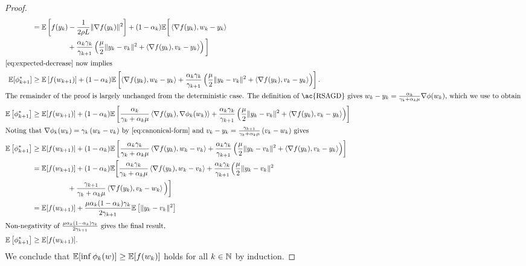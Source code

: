 \begin{proof}
\begin{align*}
        &=  \E\sbr{f(\yk) - \frac{1}{2\sgc L} \norm{\grad(\yk)}^2} + (1-\alpha_k) \E\bigg[\abr{\grad(\yk), \wk - \yk} \\ & \hspace{5em} + \frac{\alpha_k\gamma_k}{\gamma_{k+1}}\rbr{\frac{\mu}{2} \norm{\yk - v_k}^2 + \abr{\grad(\yk), v_k - \yk}}\bigg] \\
        \intertext{\autoref{eq:expected-decrease} now implies}
        \E[\phi_{k+1}^*] &\geq \E\sbr{f(\wkk)} + (1-\alpha_k) \E\sbr{\abr{\grad(\yk), \wk - \yk} + \frac{\alpha_k\gamma_k}{\gamma_{k+1}}\rbr{\frac{\mu}{2} \norm{\yk - v_k}^2 + \abr{\grad(\yk), v_k - \yk}}}. \\
        \intertext{The remainder of the proof is largely unchanged from the deterministic case. The definition of \ac{RSAGD} gives \( \wk - \yk = \frac{\alpha_k}{\gamma_k + \alpha_k \mu} \nabla \phi(\wk) \), which we use to obtain }
        \E\sbr{\phi_{k+1}^*}  &\geq  \E[f(\wkk)] + (1-\alpha_k) \E\sbr{\frac{\alpha_k}{\gamma_k + \alpha_k \mu} \abr{\grad(\yk), \nabla\phi_k(\wk)} + \frac{\alpha_k\gamma_k}{\gamma_{k+1}}\rbr{\frac{\mu}{2} \norm{\yk - v_k}^2 + \abr{\grad(\yk), v_k - \yk}}} \\
        \intertext{Noting that \( \nabla \phi_k(\wk) = \gamma_k \rbr{\wk - v_k} \) by \autoref{eq:canonical-form} and \( v_k - \yk = \frac{\gamma_{k+1}}{\gamma_k + \alpha_k \mu}\rbr{v_k - \wk} \) gives }
        \E\sbr{\phi_{k+1}^*} &\geq \E[f(\wkk)] +(1-\alpha_k) \E\sbr{\frac{\alpha_k \gamma_k}{\gamma_k + \alpha_k \mu} \abr{\grad(\yk), \wk - v_k} + \frac{\alpha_k\gamma_k}{\gamma_{k+1}}\rbr{\frac{\mu}{2} \norm{\yk - v_k}^2 + \abr{\grad(\yk), v_k - \yk}}} \\
        &= \E[f(\wkk)] + (1-\alpha_k) \E\bigg[\frac{\alpha_k \gamma_k}{\gamma_k + \alpha_k \mu} \abr{\grad(\yk), \wk - v_k} + \frac{\alpha_k\gamma_k}{\gamma_{k+1}}\Big(\frac{\mu}{2} \norm{\yk - v_k}^2 \\
        & \hspace{5em} + \frac{\gamma_{k+1}}{\gamma_k + \alpha_k \mu} \abr{\grad(\yk), v_k - \wk}\Big)\bigg] \\
        &= \E[f(\wkk)] + \frac{\mu \alpha_k(1-\alpha_k)\gamma_k}{2 \gamma_{k+1}} \E\sbr{\norm{\yk - v_k}^2} \\
        \intertext{Non-negativity of \( \frac{\mu \alpha_k(1-\alpha_k)\gamma_k}{2 \gamma_{k+1}} \) gives the final result,} 
        \E\sbr{\phi_{k+1}^*} &\geq \E[f(\wkk)].
    \end{align*}
    We conclude that \( \mathbb{E}[\inf \phi_{k}(w)] \geq \mathbb{E}[f(w_k)] \) holds for all \( k \in \mathbb{N} \) by induction. 
\end{proof}

